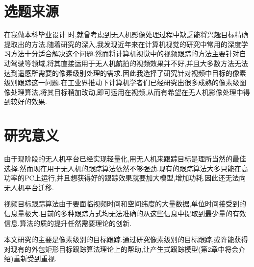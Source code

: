 \section{选题来源}
在我做本科毕业设计
\supercite{benchme}
时,就曾考虑到无人机影像处理过程中缺乏能将兴趣目标精确提取出的方法.随着研究的深入,我发现近年来在计算机视觉的研究中常用的深度学习方法十分适合解决这个问题.然而将计算机视觉中的视频跟踪的方法主要针对自动驾驶等领域,将其直接运用于无人机航拍的视频效果并不好,并且大多数方法无法达到遥感所需要的像素级别处理的需求.因此我选择了研究针对视频中目标的像素级别跟踪这一问题.在工业界推动下计算机学者们已经研究出很多成熟的像素级图像处理算法,将其目标稍加改动,即可运用在视频,从而有希望在无人机影像处理中得到较好的效果.

\section{研究意义}
由于现阶段的无人机平台已经实现轻量化,用无人机来跟踪目标是理所当然的最佳选择.然而现在用于无人机的跟踪算法依然不够强劲.现有的跟踪算法大多只能在高功率的PC上运行,并且想获得好的跟踪效果就要加大模型,增加功耗.因此还无法向无人机平台迁移.
\par
视频目标跟踪算法由于要面临视频时间和空间纬度的大量数据,单位时间接受到的信息量极大.目前的多种跟踪方式均无法准确的从这些信息中提取到最少量的有效信息.算法的质的提升任然需要理论的创新.
\par
本文研究的主要是像素级别的目标跟踪.通过研究像素级别的目标跟踪,或许能获得对现有的外包矩形目标跟踪算法理论上的帮助,让产生式跟踪模型(第2章中将会介绍)重新受到重视.

